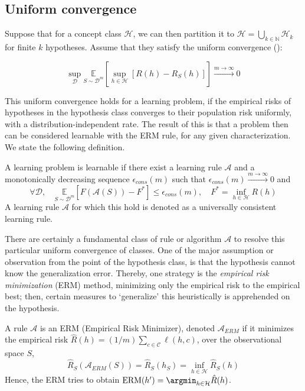 \subsection{Uniform convergence}

Suppose that for a concept class $\mathcal{H}$, we can then partition it to $\mathcal{H}=\bigcup_{k\in \mathbb{N}} \mathcal{H}_{k}$ for finite $k$ hypotheses. Assume that they satisfy the uniform convergence (\cite{JMLR:v11:shalev-shwartz10a}): 

\begin{equation}
    \sup_{\mathcal{D}} \underset{S\sim\mathcal{D}^{m}}{\mathbb{E}} \left[ \sup_{h\in\mathcal{H}} [R(h) - R_{S}(h)] \right] \overset{m\to\infty}{\longrightarrow} 0
\end{equation}

This uniform convergence holds for a learning problem, if the empirical risks of hypotheses in the hypothesis class converges to their population risk uniformly, with a distribution-independent rate. The result of this is that a problem then can be considered learnable with the ERM rule, for any given characterization. We state the following definition.

\begin{definition}
    A learning problem is learnable if there exist a learning rule $\mathcal{A}$ and a monotonically decreasing sequence $\epsilon_{cons}(m)$ such that $\epsilon_{cons}(m)\overset{m\to\infty}{\longrightarrow} 0$ and \begin{equation}
        \forall \mathcal{D} , \quad \underset{S\sim\mathcal{D}^{m}}{\mathbb{E}} \left[F(\mathcal{A}(S))-F^{*}\right] \leq \epsilon_{cons}(m) , \quad F^{*} = \inf_{h\in\mathcal{H}} R(h)
    \end{equation}
    A learning rule $\mathcal{A}$ for which this hold is denoted as a universally consistent learning rule. 
\end{definition}

There are certainly a fundamental class of rule or algorithm $\mathcal{A}$ to resolve this particular uniform convergence of classes. One of the major assumption or observation from the point of the hypothesis class, is that the hypothesis cannot know the generalization error. Thereby, one strategy is the \textit{empirical risk minimization} (ERM) method, minimizing only the empirical risk to the empirical best; then, certain measures to `generalize' this heuristically is apprehended on the hypothesis. 

\begin{definition}
    A rule $\mathcal{A}$ is an ERM (Empirical Risk Minimizer), denoted $\mathcal{A}_{ERM}$ if it minimizes the empirical risk $\hat{R}(h)=(1/m)\sum_{c\in\mathcal{C}}\ell(h,c)$, over the observational space $S$, 
    \begin{equation}
        \hat{R}_{S}(\mathcal{A}_{ERM}(S)) = \hat{R}_{S} (h_{S}) = \inf_{h\in\mathcal{H}} \hat{R}_{S}(h) 
    \end{equation}
    Hence, the ERM tries to obtain $\mathrm{ERM}(h') = \argmin_{h\in \mathcal{H}} \hat{R}(h)$. 
\end{definition}

